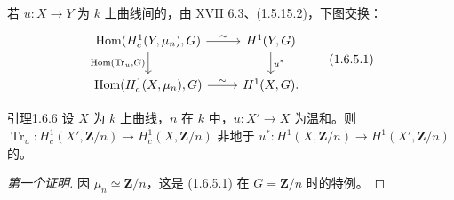 若 $u:X\to Y$ 为 $k$ 上曲线间的，由 XVII 6.3、(1.5.15.2)，下图交换：
\[\begin{tikzcd}\operatorname{Hom}(H_c^1(Y,\mu_n),G)\arrow[r,"\sim"]\arrow[d,"{\operatorname{Hom}(\operatorname{Tr}_u,G)}"']&H^1(Y,G)\arrow[d,"u^*"]\\\operatorname{Hom}(H_c^1(X,\mu_n),G)\arrow[r,"\sim"]&H^1(X,G).\end{tikzcd}\tag{1.6.5.1}\]
\begin{SGAresult}{引理}{1.6.6}
设 $X$ 为 $k$ 上曲线，$n$ 在 $k$ 中，$u:X'\to X$ 为温和。则 $\operatorname{Tr}_u:H_c^1(X',\mathbf Z/n)\to H_c^1(X,\mathbf Z/n)$ 非地于 $u^*:H^1(X,\mathbf Z/n)\to H^1(X',\mathbf Z/n)$ 的。
\end{SGAresult}
\begin{proof}[第一个证明]
因 $\mu_n\simeq\mathbf Z/n$，这是 (1.6.5.1) 在 $G=\mathbf Z/n$ 时的特例。
\end{proof}
